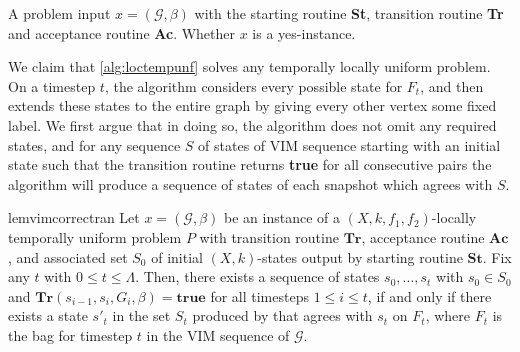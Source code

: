 \documentclass[a4paper,UKenglish,cleveref, autoref, thm-restate]{lipics-v2021} %
\begin{document}
\begin{toappendix}
\begin{algorithm}[H]\caption{\textsc{Locally Temporally Uniform Algorithm}}\label{alg:loctempunf}
\begin{algorithmic}[1]
\Require A problem input $x = (\mathcal{G}, \beta)$ with the starting routine \textbf{St}, transition routine \textbf{Tr} and acceptance routine \textbf{Ac}.
\Ensure Whether $x$ is a yes-instance.
            \EndIf
        \EndFor
    \EndFor
    \EndFor
        \EndIf
    \EndFor
    \end{algorithmic}
\end{algorithm}


We claim that \cref{alg:loctempunf} solves any temporally locally uniform problem.  On a timestep $t$, the algorithm considers every possible state for $F_t$, and then extends these states to the entire graph by giving every other vertex some fixed label. We first argue that in doing so, the algorithm does not omit any required states, and for any sequence $S$ of states of VIM sequence starting with an initial state such that the transition routine returns \textbf{true} for all consecutive pairs the algorithm will produce a sequence of states of each snapshot which agrees with $S$.

\begin{restatable}{lem}{vimcorrectran}\label{lem:correctran} 
Let $x=(\mathcal{G},\beta)$ be an instance of a $(X,k,f_1,f_2)$-locally temporally uniform problem $P$ with transition routine $\textbf{Tr}$, acceptance routine $\textbf{Ac}$, and associated set $S_0$ of initial $(X,k)$-states output by starting routine $\textbf{St}$. Fix any $t$ with $0\leq t\leq \Lambda$. Then, there exists a sequence of states $s_0, \ldots, s_t$ with $s_0 \in S_0$ and $\textbf{Tr}(s_{i-1}, s_i, G_i,\beta)=\textbf{true}$ for all timesteps $1 \leq i \leq t$, if and only if there exists a state $s'_t$ in the set $S_t$ produced by  that agrees with $s_t$ on $F_t$, where $F_t$ is the bag for timestep $t$ in the VIM sequence of $\mathcal{G}$.
\end{restatable}


\end{toappendix}
\end{document}
